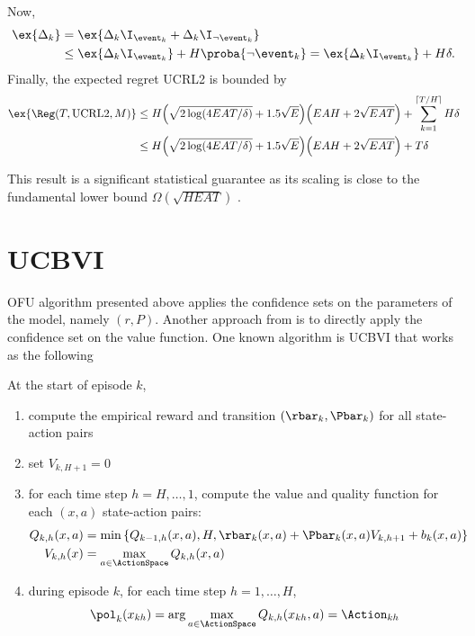             Now,
            \begin{align*}
                \ex{\Delta_k}
                &=\ex{\Delta_k\I_{\event_k} +\Delta_k\I_{\neg\event_k}} \\
                &\le \ex{\Delta_k\I_{\event_k}} +H\proba{\neg\event_k} =\ex{\Delta_k\I_{\event_k}} +H\delta.
            \end{align*}
            Finally, the expected regret UCRL2 is bounded by
            \begin{align*}
                \ex{\Reg(T,\mathrm{UCRL2},M)} 
                &\le H\Big(\sqrt{2\log(4EAT/\delta)} +1.5\sqrt{E}\Big) \Big(EAH +2\sqrt{EAT}\Big) +\sum_{k=1}^{\lceil T/H\rceil}H\delta \\
                &\le H\Big(\sqrt{2\log(4EAT/\delta)} +1.5\sqrt{E}\Big) \Big(EAH +2\sqrt{EAT}\Big) +T\delta
            \end{align*}
            
            This result is a significant statistical guarantee as its scaling is close to the fundamental lower bound $\Omega(\sqrt{HEAT})$ \cite{jaksch2010near, osband2016lower}.
    
    \section{UCBVI}
    \label{sec:ucbvi}
        OFU algorithm presented above applies the confidence sets on the parameters of the model, namely $(r,P)$. Another approach from \cite{gheshlaghiazarMinimaxRegretBounds2017} is to directly apply the confidence set on the value function. One known algorithm is UCBVI that works as the following
        
        At the start of episode $k$,
        \begin{enumerate}
            \item compute the empirical reward and transition $(\rbar_k,\Pbar_k)$ for all state-action pairs
            \item set $V_{k,H+1}=0$
            \item for each time step $h=H,\dots,1$, compute the value and quality function for each $(x,a)$ state-action pairs:
            \begin{align*}
                Q_{k,h}(x,a) &=\min\left\{Q_{k-1,h}(x,a), H, \rbar_k(x,a) +\Pbar_k(x,a)V_{k,h+1} +b_k(x,a)\right\} \\
                V_{k,h}(x) &= \max_{a\in\ActionSpace}Q_{k,h}(x,a)
            \end{align*}
            \item during episode $k$, for each time step $h=1,\dots,H$, 
            \begin{align*}
                \pol_{k}(x_{kh}) =\arg\max_{a\in\ActionSpace}Q_{k,h}(x_{kh},a)=\Action_{kh}
            \end{align*}
        \end{enumerate}
        
